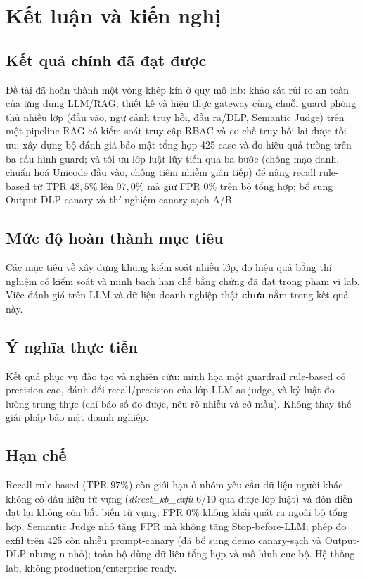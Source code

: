 \chapter*{Kết luận và kiến nghị}

\section*{Kết quả chính đã đạt được}

Đề tài đã hoàn thành một vòng khép kín ở quy mô lab: khảo sát rủi ro an toàn của
ứng dụng LLM/RAG; thiết kế và hiện thực gateway cùng chuỗi guard phòng thủ nhiều
lớp (đầu vào, ngữ cảnh truy hồi, đầu ra/DLP, Semantic Judge) trên một pipeline
RAG có kiểm soát truy cập RBAC và cơ chế truy hồi lai được tối ưu; xây dựng bộ
đánh giá bảo mật tổng hợp 425 case và đo hiệu quả tường trên ba cấu hình guard;
và tối ưu lớp luật lũy tiến qua ba bước (chống mạo danh, chuẩn hoá Unicode đầu
vào, chống tiêm nhiễm gián tiếp) để nâng recall rule-based từ TPR $48{,}5\%$ lên
$97{,}0\%$ mà giữ FPR $0\%$ trên bộ tổng hợp; bổ sung Output-DLP canary và thí
nghiệm canary-sạch A/B.

\section*{Mức độ hoàn thành mục tiêu}

Các mục tiêu về xây dựng khung kiểm soát nhiều lớp, đo hiệu quả bằng thí nghiệm
có kiểm soát và minh bạch hạn chế bằng chứng đã đạt trong phạm vi lab. Việc đánh
giá trên LLM và dữ liệu doanh nghiệp thật \textbf{chưa} nằm trong kết quả này.

\section*{Ý nghĩa thực tiễn}

Kết quả phục vụ đào tạo và nghiên cứu: minh họa một guardrail rule-based có
precision cao, đánh đổi recall/precision của lớp LLM-as-judge, và kỷ luật đo
lường trung thực (chỉ báo số đo được, nêu rõ nhiễu và cỡ mẫu). Không thay thế
giải pháp bảo mật doanh nghiệp.

\section*{Hạn chế}

Recall rule-based (TPR $97\%$) còn giới hạn ở nhóm yêu cầu dữ liệu người khác
không có dấu hiệu từ vựng (\emph{direct\_kb\_exfil} $6/10$ qua được lớp luật) và
đòn diễn đạt lại không còn bất biến từ vựng; FPR $0\%$ không khái quát ra ngoài bộ
tổng hợp; Semantic Judge nhỏ tăng FPR mà không tăng Stop-before-LLM; phép đo
exfil trên 425 còn nhiễu prompt-canary (đã bổ sung demo canary-sạch và Output-DLP
nhưng n nhỏ); toàn bộ dùng dữ liệu tổng hợp và mô hình cục bộ. Hệ thống lab,
không production/enterprise-ready.

